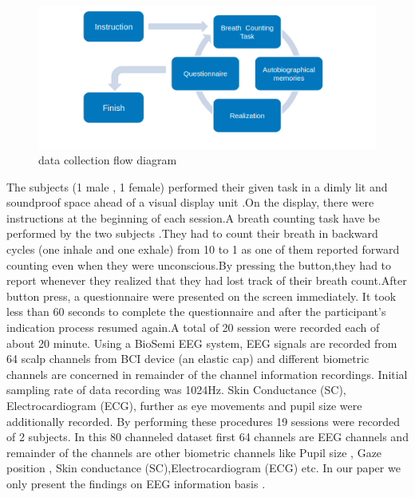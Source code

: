  \begin{figure}
    \centering
    \includegraphics[width=15cm]{Pictures/data_collection.png}
    \caption{data collection flow diagram }
    \label{fig:data_collection}
\end{figure}

The subjects (1 male , 1 female) performed their given task in a dimly lit and soundproof space ahead of a visual display unit .On the display, there were instructions at the beginning of each session.A breath counting task have be performed by the two subjects .They had to count their breath in backward cycles (one inhale and one exhale) from 10 to 1 as one of them reported forward counting even when they were unconscious.By pressing the button,they had to report whenever they realized that they had lost track of their breath count.After button press, a questionnaire were presented on the screen immediately. It took less than 60 seconds to complete the questionnaire and after the participant's indication process resumed again.A total of 20 session were recorded each of about 20 minute. Using a BioSemi EEG system, EEG signals are recorded from 64 scalp channels from BCI device (an elastic cap) and different biometric channels are concerned in remainder of the channel information recordings. Initial sampling rate of data recording was 1024Hz. Skin Conductance (SC), Electrocardiogram (ECG), further as eye movements and pupil size were additionally recorded. By performing these procedures 19 sessions were recorded of 2 subjects. In this 80 channeled dataset first 64 channels are EEG channels and remainder of the channels are other biometric channels like Pupil size , Gaze position , Skin conductance (SC),Electrocardiogram (ECG) etc. In our paper we only present the findings on EEG information basis .
